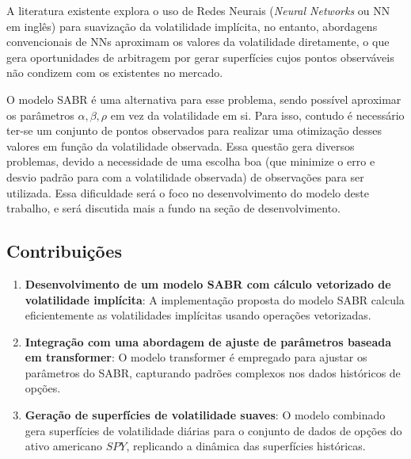A literatura existente explora o uso de Redes Neurais (\textit{Neural Networks} ou NN em inglês) para suavização da volatilidade implícita, no entanto, abordagens convencionais de NNs aproximam os valores da volatilidade diretamente, o que gera oportunidades de arbitragem por gerar superfícies cujos pontos observáveis não condizem com os existentes no mercado.

O modelo SABR é uma alternativa para esse problema, sendo possível aproximar os parâmetros $\alpha, \beta, \rho$ em vez da volatilidade em si. Para isso, contudo é necessário ter-se um conjunto de pontos observados para realizar uma otimização desses valores em função da volatilidade observada. Essa questão gera diversos problemas, devido a necessidade de uma escolha boa (que minimize o erro e desvio padrão para com a volatilidade observada) de observações para ser utilizada. Essa dificuldade será o foco no desenvolvimento do modelo deste trabalho, e será discutida mais a fundo na seção de desenvolvimento.

\subsection{Contribuições}

\begin{enumerate}
	\item \textbf{Desenvolvimento de um modelo SABR com cálculo vetorizado de volatilidade implícita}: A implementação proposta do modelo SABR calcula eficientemente as volatilidades implícitas usando operações vetorizadas.
	\item \textbf{Integração com uma abordagem de ajuste de parâmetros baseada em transformer}: O modelo transformer é empregado para ajustar os parâmetros do SABR, capturando padrões complexos nos dados históricos de opções.
	\item \textbf{Geração de superfícies de volatilidade suaves}: O modelo combinado gera superfícies de volatilidade diárias para o conjunto de dados de opções do ativo americano $SPY$, replicando a dinâmica das superfícies históricas.
\end{enumerate}